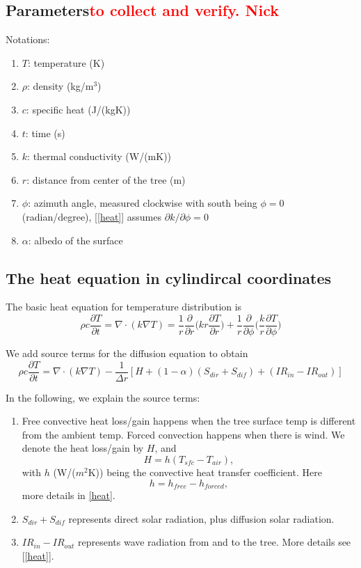 \documentclass[12pt]{article}
\begin{document}
\subsection{Parameters\textcolor{red}{to collect and verify. Nick}}
Notations: 
\begin{enumerate}
\item $T$: temperature (K)
\item $\rho$: density (kg/m$^3$)
\item $c$: specific heat (J/(kgK))
\item $t$: time (s)
\item $k$: thermal conductivity (W/(mK))
\item $r$: distance from center of the tree (m)
\item $\phi$: azimuth angle, measured clockwise with south being $\phi=0$ (radian/degree), [\ref{heat}] assumes $\partial k/\partial \phi=0$
\item $\alpha$: albedo of the surface
\end{enumerate}

\subsection{The heat equation in cylindircal coordinates}
The basic heat equation for temperature distribution is 
\begin{equation}
\rho c\frac{\partial T}{\partial t}=\nabla\cdot(k\nabla T)=\frac{1}{r}\frac{\partial}{\partial r}\bigg(kr\frac{\partial T}{\partial r}\bigg)+\frac{1}{r}\frac{\partial}{\partial \phi}\bigg(\frac{k}{r}\frac{\partial T}{\partial \phi}\bigg)\label{heat}
\end{equation}

We add source terms for the diffusion equation to obtain
\begin{equation}
\rho c\frac{\partial T}{\partial t}=\nabla\cdot(k\nabla T)-\frac{1}{\Delta r}[H+(1-\alpha)(S_{dir}+S_{dif})+(IR_{in}-IR_{out})]
\end{equation}

In the following, we explain the source terms: 
\begin{enumerate}
\item 
Free convective heat loss/gain happens when the tree surface temp is different from the ambient temp. Forced convection happens when there is wind. We denote the heat loss/gain by $H$, and 
\begin{equation}
H=h(T_{sfc}-T_{air}),
\end{equation}
with $h$ (W/($m^2$K)) being the convective heat transfer coefficient. Here
\begin{equation}
h=h_{free}-h_{forced},
\end{equation}
more details in \ref{heat}. 

\item $S_{dir}+S_{dif}$ represents direct solar radiation, plus diffusion solar radiation. 

\item $IR_{in}-IR_{out}$ represents wave radiation from and to the tree. More details see [\ref{heat}].

\end{enumerate}
\end{document}

